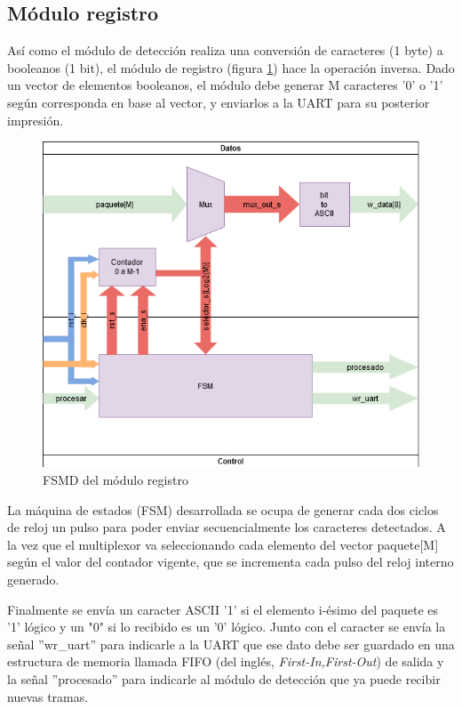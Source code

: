 	\subsection{Módulo registro}
	
		Así como el módulo de detección realiza una conversión de caracteres (1 byte) a booleanos (1 bit), el módulo de registro (figura \ref{fig:FSMD_Registro}) hace la operación inversa. Dado un vector de elementos booleanos, el módulo debe generar M caracteres '0' o '1' según corresponda en base al vector, y enviarlos a la UART para su posterior impresión.
		
		\begin{figure}[h]
		\centering
			\includegraphics[scale=.65]{./Figures/FSMD-Registro}
			\caption{FSMD del módulo registro}
			\label{fig:FSMD_Registro}
		\end{figure}

		
		La máquina de estados (FSM) desarrollada se ocupa de generar cada dos ciclos de reloj un pulso para poder enviar secuencialmente los caracteres detectados. A la vez que el multiplexor va seleccionando cada elemento del vector paquete[M] según el valor del contador vigente, que se incrementa cada pulso del reloj interno generado.
		
		Finalmente se envía un caracter ASCII '1' si el elemento i-ésimo del paquete es '1' lógico y un "0" si lo recibido es un '0' lógico. Junto con el caracter se envía la señal ''wr\_uart'' para indicarle a la UART que ese dato debe ser guardado en una estructura de memoria llamada FIFO (del inglés, \textit{First-In,First-Out}) de salida y la señal ''procesado'' para indicarle al módulo de detección que ya puede recibir nuevas tramas.
	
